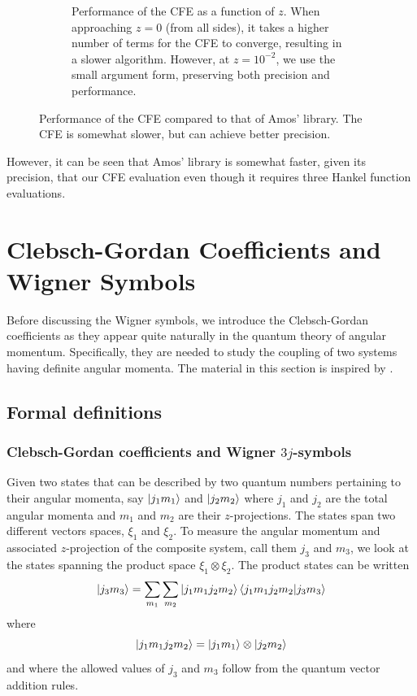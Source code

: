 \begin{figure}
\begin{subfigure}[t]{0.47\textwidth}
  \caption{Performance of the CFE as a function of $z$. When approaching
  $z=0$ (from all sides), it takes a higher number of terms for the 
  CFE to converge, resulting in a slower algorithm. However, at $z=10^{-2}$, we 
  use the small argument form, preserving both precision and performance.}
 \end{subfigure}
 \caption[Performance of the CFE compared to Amos' library's.]
	 {Performance of the CFE compared to that of Amos' library. The CFE is somewhat
	 slower, but can achieve better precision.}
\end{figure}


However, it can be seen that Amos' library is somewhat faster, given its
precision, that our CFE evaluation 
even though it requires three Hankel function evaluations. 

\section{Clebsch-Gordan Coefficients and Wigner Symbols}\label{sec:app.numTools.wignerSymbols}
Before discussing the Wigner symbols, we introduce the Clebsch-Gordan
coefficients as they appear quite naturally in the quantum theory
of angular momentum. Specifically, they are needed to study the coupling
of two systems having definite angular momenta. The material in this section
is inspired by \cite{VAR1988,BRI1993}. 

\subsection{Formal definitions}
\subsubsection{Clebsch-Gordan coefficients and Wigner $3j$-symbols}
Given two states that can be described by two quantum numbers
pertaining to their angular momenta, say $\ket{j_1m_1}$
and $\ket{j_2m_2}$ where $j_1$ and $j_2$ are the total
angular momenta and $m_1$ and $m_2$ are their $z$-projections. 
The states span two different vectors spaces, $\xi_1$ and $\xi_2$. 
To measure the angular momentum and associated $z$-projection
of the composite system, call them $j_3$ and $m_3$, we look at
the states spanning the product space $\xi_1\otimes\xi_2$. The product
states can be written
  \begin{equation}
   \ket{j_3m_3} = \sum_{m_1}\sum_{m_2}\ket{j_1m_1j_2m_2}\braket{j_1m_1j_2m_2|j_3m_3}
  \end{equation}
where
  \begin{equation*}
   \ket{j_1m_1j_2m_2}=\ket{j_1m_1}\otimes\ket{j_2m_2}
  \end{equation*}
and where the allowed values of $j_3$ and $m_3$ follow 
from the quantum vector addition rules. 

